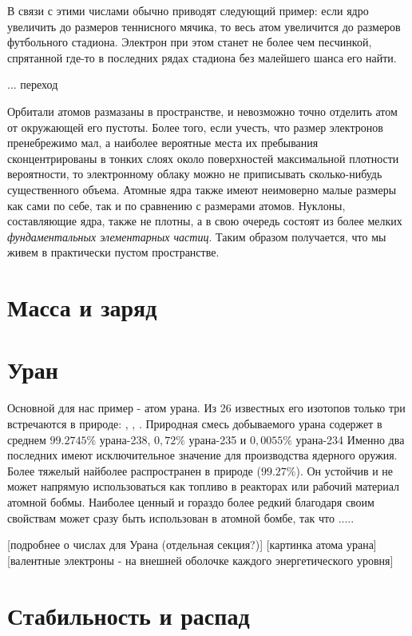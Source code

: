 В связи с этими числами обычно приводят следующий пример: если ядро увеличить до размеров теннисного мячика, то весь атом увеличится до размеров футбольного стадиона.
Электрон при этом станет не более чем песчинкой, спрятанной где-то в последних рядах стадиона без малейшего шанса его найти.

... переход

Орбитали атомов размазаны в пространстве, и невозможно точно отделить атом от окружающей его пустоты.
Более того, если учесть, что размер электронов пренебрежимо мал, а наиболее вероятные места их пребывания сконцентрированы в тонких слоях около поверхностей максимальной плотности вероятности, то электронному облаку можно не приписывать сколько-нибудь существенного объема.
Атомные ядра также имеют неимоверно малые размеры как сами по себе, так и по сравнению с размерами атомов.
Нуклоны, составляющие ядра, также не плотны, а в свою очередь состоят из более мелких \textit{фундаментальных элементарных частиц}.
Таким образом получается, что мы живем в практически пустом пространстве.


\section*{Масса и заряд}


\section*{Уран}

Основной для нас пример - атом урана.
Из 26 известных его изотопов только три встречаются в природе: , , .
Природная смесь добываемого урана содержет в среднем $99.2745\%$ урана-238, $0,72\%$ урана-235 и $0,0055\%$ урана-234
Именно два последних имеют исключительное значение для производства ядерного оружия.
Более тяжелый  найболее распространен в природе ($99.27\%$).
Он устойчив и не может напрямую использоваться как топливо в реакторах или рабочий материал атомной бобмы.
Наиболее ценный и гораздо более редкий  благодаря своим свойствам может сразу быть использован в атомной бомбе, так что .....  

[подробнее о числах для Урана (отдельная секция?)]
[картинка атома урана]
[валентные электроны - на внешней оболочке каждого энергетического уровня]


\section*{Стабильность и распад}

